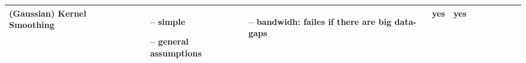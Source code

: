 \begin{table}[!ht]
\begin{tabular}{p{1.6cm}p{3.3cm}p{3.3cm}p{3.3cm}p{0.4cm}p{0.4cm}p{3cm}p{3cm}p{3cm}p{3cm}p{3cm}p{3cm}|}


		(Gaussian) Kernel Smoothing                                                                                                                                  &
		~                                                                                                                                                            &
		\begin{cptitemize} \item[--]  simple \item[--]  general assumptions                                                                  \end{cptitemize}        &
		\begin{cptitemize} \item[--]  bandwidh: failes if there are big data-gaps                                                     \end{cptitemize}               &
		yes                                                                                                                                                          &
		yes                                                                                                                                                            \\ \hline%


\end{tabular}
\end{table}
